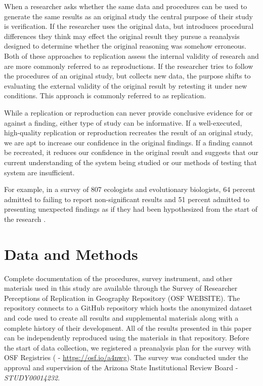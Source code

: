 \documentclass[]{interact}
\theoremstyle{plain}%
\theoremstyle{definition}
\theoremstyle{remark}
\begin{document}
When a researcher asks whether the same data and procedures can be used to generate the same results as an original study the central purpose of their study is verification.
If the researcher uses the original data, but introduces procedural differences they think may effect the original result they pursue a reanalysis designed to determine whether the original reasoning was somehow erroneous. 
Both of these approaches to replication assess the internal validity of research and are more commonly referred to as reproductions.
If the researcher tries to follow the procedures of an original study, but collects new data, the purpose shifts to evaluating the external validity of the original result by retesting it under new conditions.
This approach is commonly referred to as replication. 

While a replication or reproduction can never provide conclusive evidence for or against a finding, either type of study can be informative. 
If a well-executed, high-quality replication or reproduction recreates the result of an original study, we are apt to increase our confidence in the original findings. 
If a finding cannot be recreated, it reduces our confidence in the original result and suggests that our current understanding of the system being studied or our methods of testing that system are insufficient.

For example, in a survey of 807 ecologists and evolutionary biologists, 64 percent admitted to failing to report non-significant results and 51 percent admitted to presenting unexpected findings as if they had been hypothesized from the start of the research \citep{fraser2018questionable}.

\section*{Data and Methods}
Complete documentation of the procedures, survey instrument, and other materials used in this study are available through the Survey of Researcher Perceptions of Replication in Geography Repository (OSF WEBSITE).
The repository connects to a GitHub repository which hosts the anonymized dataset and code used to create all results and supplemental materials along with a complete history of their development. 
All of the results presented in this paper can be independently reproduced using the materials in that repository.
Before the start of data collection, we registered a preanalysis plan for the survey with OSF Registries (\citet{Kedron_RPl_Survey_PAP} - \url{https://osf.io/a4nwg}). 
The survey was conducted under the approval and supervision of the Arizona State Institutional Review Board - \textit{STUDY00014232}.
\end{document}
